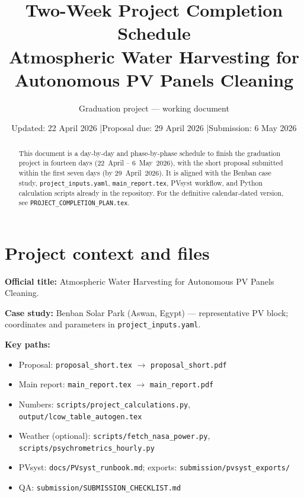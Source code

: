 \documentclass[11pt,a4paper]{article}
\title{\textbf{Two-Week Project Completion Schedule}\\[0.35em]
\large Atmospheric Water Harvesting for Autonomous PV Panels Cleaning}
\author{Graduation project --- working document}
\date{Updated: 22 April 2026 \quad|\quad Proposal due: 29 April 2026 \quad|\quad Submission: 6 May 2026}
\begin{document}
\maketitle

\begin{abstract}
\noindent
This document is a day-by-day and phase-by-phase schedule to finish the graduation project in fourteen days (22~April -- 6~May~2026), with the short proposal submitted within the first seven days (by 29~April~2026). It is aligned with the Benban case study, \texttt{project\_inputs.yaml}, \texttt{main\_report.tex}, PVsyst workflow, and Python calculation scripts already in the repository. For the definitive calendar-dated version, see \texttt{PROJECT\_COMPLETION\_PLAN.tex}.
\end{abstract}

\tableofcontents
\newpage

\section{Project context and files}
\textbf{Official title:} Atmospheric Water Harvesting for Autonomous PV Panels Cleaning.

\textbf{Case study:} Benban Solar Park (Aswan, Egypt) --- representative PV block; coordinates and parameters in \texttt{project\_inputs.yaml}.

\textbf{Key paths:}
\begin{itemize}[nosep]
  \item Proposal: \texttt{proposal\_short.tex} $\rightarrow$ \texttt{proposal\_short.pdf}
  \item Main report: \texttt{main\_report.tex} $\rightarrow$ \texttt{main\_report.pdf}
  \item Numbers: \texttt{scripts/project\_calculations.py}, \texttt{output/lcow\_table\_autogen.tex}
  \item Weather (optional): \texttt{scripts/fetch\_nasa\_power.py}, \texttt{scripts/psychrometrics\_hourly.py}
  \item PVsyst: \texttt{docs/PVsyst\_runbook.md}; exports: \texttt{submission/pvsyst\_exports/}
  \item QA: \texttt{submission/SUBMISSION\_CHECKLIST.md}
\end{itemize}
\end{document}
